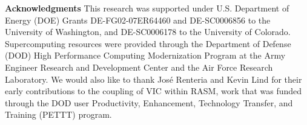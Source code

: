 {\bf Acknowledgments}
This research was supported under U.S. Department of Energy (DOE) Grants DE-FG02-07ER64460 and DE-SC0006856 to the University of Washington, and DE-SC0006178 to the University of Colorado.
Supercomputing resources were provided through the Department of Defense (DOD) High Performance Computing Modernization Program at the Army Engineer Research and Development Center and the Air Force Research Laboratory.
We would also like to thank José Renteria and Kevin Lind for their early contributions to the coupling of VIC within RASM, work that was funded through the DOD user Productivity, Enhancement, Technology Transfer, and Training (PETTT) program.
